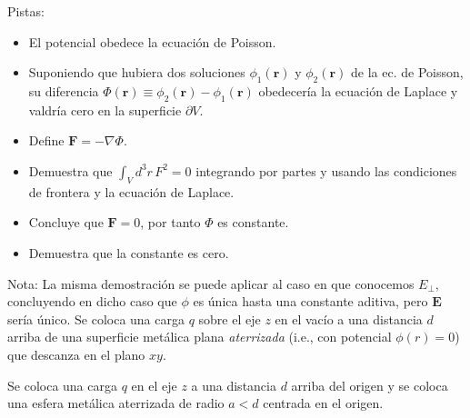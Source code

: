 \documentclass{exam}
\begin{document}
\begin{questions}
Pistas:
\begin{itemize}
\item El potencial obedece la ecuación de Poisson.
\item Suponiendo que hubiera dos soluciones $\phi_1(\bm r)$ y
  $\phi_2(\bm r)$ de la ec. de Poisson, su diferencia $\Phi(\bm
  r)\equiv\phi_2(\bm r)-\phi_1(\bm r)$ obedecería la ecuación de
  Laplace y valdría cero en la superficie $\partial V$.
\item Define $\bm F=-\nabla\Phi$.
\item Demuestra que $\int_Vd^3r\, F^2=0$ integrando por
  partes y usando las condiciones de frontera y la ecuación de
  Laplace.
\item Concluye que $\bm F=0$, por tanto $\Phi$ es constante.
\item Demuestra que la constante es cero.
\end{itemize}
Nota: La misma demostración se puede aplicar al caso en que conocemos
$E_\perp$, concluyendo en dicho caso que $\phi$ es única hasta una
constante aditiva, pero $\bm E$ sería único.
\question Se coloca una carga $q$ sobre el eje $z$ en el vacío a una distancia $d$
arriba de una superficie metálica plana {\em aterrizada} (i.e., con potencial
$\phi(r)=0$) que descanza en el plano $xy$.
\question Se coloca una carga $q$ en el eje $z$ a una distancia $d$
arriba del origen y se coloca una esfera metálica aterrizada de radio $a<d$
centrada en el origen.
\end{questions}
\end{document}
